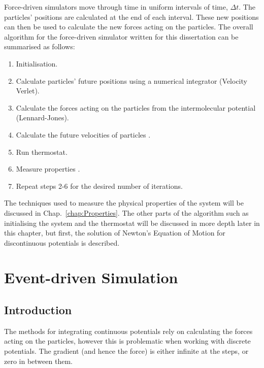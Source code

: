 \documentclass[12pt]{UoAthesis} \usepackage{booktabs}
\begin{document}
Force-driven simulators move through time in uniform intervals of
time, $\Delta t$.  The particles' positions are calculated at the end
of each interval.  These new positions can then be used to calculate
the new forces acting on the particles. The overall algorithm for the
force-driven simulator written for this dissertation can be summarised
as follows:
\begin{enumerate} 
\item Initialisation.
\item Calculate particles' future positions using a numerical
  integrator (Velocity Verlet).
\item Calculate the forces acting on the particles from the
  intermolecular potential (Lennard-Jones).
\item Calculate the future velocities of particles .
\item Run thermostat.
\item Measure properties .
\item Repeat steps 2-6 for the desired number of iterations.
\end{enumerate} 

The techniques used to measure the physical properties of the system
will be discussed in Chap.~\ref{chap:Properties}.  The other parts
of the algorithm such as initialising the system and the thermostat
will be discussed in more depth later in this chapter, but first, the
solution of Newton's Equation of Motion for discontinuous potentials
is described.

\section{Event-driven Simulation}

\subsection{\label{sec:EDIntro}Introduction} 
The methods for integrating continuous potentials rely on calculating
the forces acting on the particles, however this is problematic when
working with discrete potentials.  The gradient (and hence the force) is
either infinite at the steps, or zero in between them.
\end{document}
